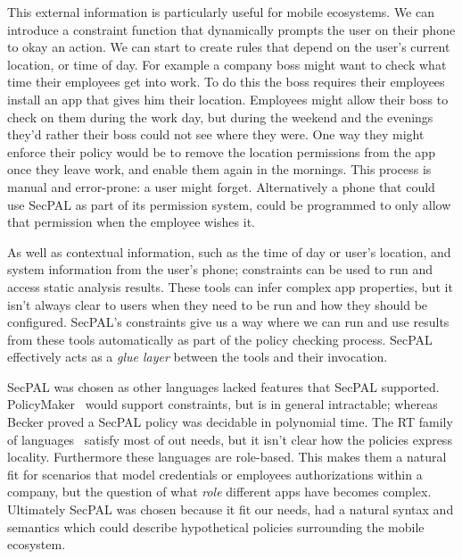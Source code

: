 \documentclass[thesis.tex]{subfiles}
\begin{document}
\begin{description}
    This external information is particularly useful for mobile ecosystems. We
    can introduce a constraint function that dynamically prompts the user on their
    phone to okay an action. We can start to create rules that depend on the user's
    current location, or time of day. For example a company boss might want to check
    what time their employees get into work. To do this the boss requires their
    employees install an app that gives him their location. Employees might allow
    their boss to check on them during the work day, but during the weekend and the
    evenings they'd rather their boss could not see where they were. One way they
    might enforce their policy would be to remove the location permissions from the
    app once they leave work, and enable them again in the mornings. This process is
    manual and error-prone: a user might forget. Alternatively a phone that could
    use SecPAL as part of its permission system, could be programmed to only allow
    that permission when the employee wishes it.

    As well as contextual information, such as the time of day or user's
    location, and system information from the user's phone; constraints can be used to run and access
    static analysis results.  These tools can infer complex app properties, but
    it isn't always clear to users when they need to be run and how they should
    be configured.  SecPAL's constraints give us a way where we can run and use
    results from these tools automatically as part of the policy checking
    process. SecPAL effectively acts as a \emph{glue layer} between the tools
    and their invocation.

\end{description}

SecPAL was chosen as other languages lacked features that SecPAL supported.
PolicyMaker~\cite{blaze_decentralized_1996} would support constraints, but is in
general intractable; whereas Becker proved a SecPAL policy was decidable in
polynomial time.  The RT family of
languages~\cite{li_datalog_2003,ninghui_li_design_2002,li_distributed_2003}
satisfy most of out needs, but it isn't clear how the policies express locality.
Furthermore these languages are role-based.  This makes them a natural fit for
scenarios that model credentials or employees authorizations within a company,
but the question of what \emph{role} different apps have becomes complex.
Ultimately SecPAL was chosen because it fit our needs, had a natural syntax and
semantics which could describe hypothetical policies surrounding the mobile
ecosystem.
\end{document}
